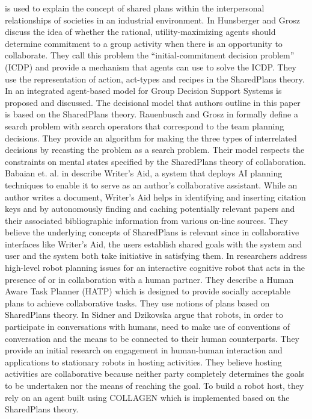 \cite{grosz:plans-discourse} is used to explain the concept of shared plans
within the interpersonal relationships of societies in an industrial
environment. In \cite{hunsberger:auction-collaborative} Hunsberger and Grosz
discuss the idea of whether the rational, utility-maximizing agents should
determine commitment to a group activity when there is an opportunity to
collaborate. They call this problem the ``initial-commitment decision problem''
(ICDP) and provide a mechanism that agents can use to solve the ICDP. They use
the representation of action, act-types and recipes in the SharedPlans theory.
In \cite{zamfirescu:gdss} an integrated agent-based model for Group Decision
Support Systems is proposed and discussed. The decisional model that authors
outline in this paper is based on the SharedPlans theory. Rauenbusch and Grosz
in \cite{rauenbusch:decision-making-planning} formally define a search problem
with search operators that correspond to the team planning decisions.
They provide an algorithm for making the three types of interrelated decisions
by recasting the problem as a search problem. Their model respects the
constraints on mental states specified by the SharedPlans theory of
collaboration. Babaian et. al. in \cite{babaian:writers-assistant} describe
Writer's Aid, a system that deploys AI planning techniques to enable it to serve
as an author's collaborative assistant. While an author writes a document,
Writer's Aid helps in identifying and inserting citation keys and by
autonomously finding and caching potentially relevant papers and their
associated bibliographic information from various on-line sources. They believe
the underlying concepts of SharedPlans is relevant since in collaborative
interfaces like Writer’s Aid, the users establish shared goals with the system
and user and the system both take initiative in satisfying them. In
\cite{montreuil:planning-robot-activity} researchers address high-level robot
planning issues for an interactive cognitive robot that acts in the presence of
or in collaboration with a human partner. They describe a Human Aware Task
Planner (HATP) which is designed to provide socially acceptable plans to achieve
collaborative tasks. They use notions of plans based on SharedPlans theory. In
\cite{sidner:enagagement-robot} Sidner and Dzikovska argue that robots, in order
to participate in conversations with humans, need to make use of conventions of
conversation and the means to be connected to their human counterparts. They
provide an initial research on engagement in human-human interaction and
applications to stationary robots in hosting activities. They believe hosting
activities are collaborative because neither party completely determines the
goals to be undertaken nor the means of reaching the goal. To build a robot
host, they rely on an agent built using COLLAGEN which is implemented based on
the SharedPlans theory.\\

